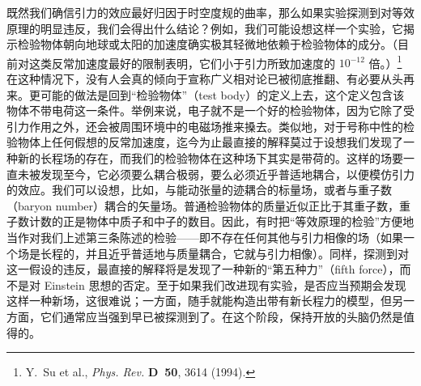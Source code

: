 既然我们确信引力的效应最好归因于时空度规的曲率，那么如果实验探测到对等效原理的明显违反，我们会得出什么结论？例如，我们可能设想这样一个实验，它揭示检验物体朝向地球或太阳的加速度确实极其轻微地依赖于检验物体的成分。（目前对这类反常加速度最好的限制表明，它们小于引力所致加速度的 $10^{-12}$ 倍。）\footnote{Y.~Su et al., \emph{Phys. Rev.} \textbf{D~50}, 3614 (1994).} 在这种情况下，没有人会真的倾向于宣称广义相对论已被彻底推翻、有必要从头再来。更可能的做法是回到“检验物体”（test body）的定义上去，这个定义包含该物体不带电荷这一条件。举例来说，电子就不是一个好的检验物体，因为它除了受引力作用之外，还会被周围环境中的电磁场推来搡去。类似地，对于号称中性的检验物体上任何假想的反常加速度，迄今为止最直接的解释莫过于设想我们发现了一种新的长程场的存在，而我们的检验物体在这种场下其实是带荷的。这样的场要一直未被发现至今，它必须要么耦合极弱，要么必须近乎普适地耦合，以便模仿引力的效应。我们可以设想，比如，与能动张量的迹耦合的标量场，或者与重子数（baryon number）耦合的矢量场。普通检验物体的质量近似正比于其重子数，重子数计数的正是物体中质子和中子的数目。因此，有时把“等效原理的检验”方便地当作对我们上述第三条陈述的检验——即不存在任何其他与引力相像的场（如果一个场是长程的，并且近乎普适地与质量耦合，它就与引力相像）。同样，探测到对这一假设的违反，最直接的解释将是发现了一种新的“第五种力”（fifth force），而不是对 Einstein 思想的否定。至于如果我们改进现有实验，是否应当预期会发现这样一种新场，这很难说；一方面，随手就能构造出带有新长程力的模型，但另一方面，它们通常应当强到早已被探测到了。在这个阶段，保持开放的头脑仍然是值得的。

